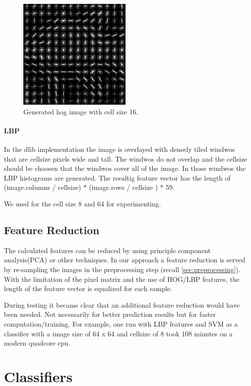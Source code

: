 \documentclass[a4paper,10pt]{article}
\begin{document}
\begin{figure}[htb]
\includegraphics[scale=0.5]{images/hog/256_256_16.png}

\caption{Generated hog image with cell size 16.}

\label{fig:resize}
\end{figure}

\paragraph{LBP}
In the dlib implementation the image is overlayed with densely tiled windwos that are cellsize pixels wide and tall. The windwos do not overlap and the cellsize should
be choosen that the windwos cover all of the image. In those windwos the LBP histograms are generated. 
The resultig feature vector has the length of (image.columns / cellsize)  * (image.rows / cellsize ) * 59.

We used for the cell size 8 and 64 for experimenting.

\subsection{Feature Reduction}

The calculated features can be reduced by using principle component analysis(PCA) or other techniques.
In our approach a feature reduction is served by re-sampling the images in the preprocessing step (recall \autoref{sec:preprocessing}).
With the limitation of the pixel matrix and the use of HOG/LBP features, the length of the feature vector is equalized for each sample.

During testing it became clear that an additional feature reduction would have been needed. Not necessarily for better prediction results but for faster computation/training. 
For example, one run with LBP features and SVM as a classifier with a image size of 64 x 64 and cellsize of 8 took 108 minutes on a modern quadcore cpu.
\section{Classifiers}
\end{document}

